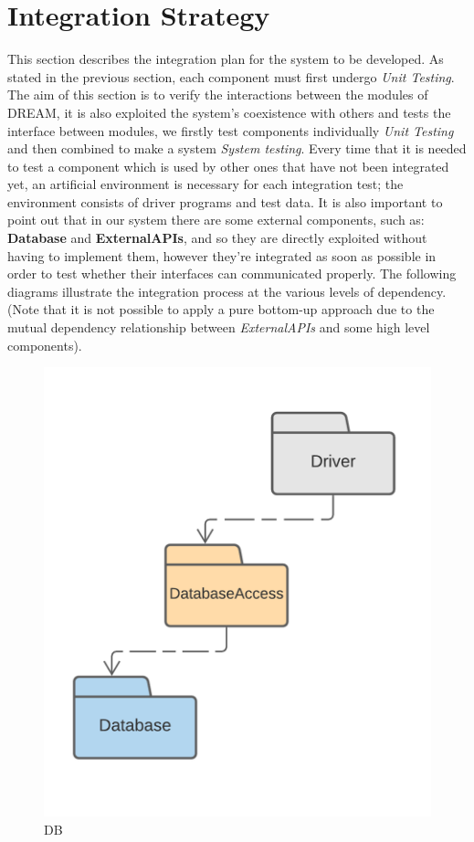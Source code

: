 \section{Integration Strategy}

This section describes the integration plan for the system to be developed. As stated in the previous section, each component must first undergo \textit{Unit Testing}.
The aim of this section is to verify the interactions between the modules of DREAM, it is also exploited the system's coexistence with others and tests the interface between modules, we firstly test components individually \textit{Unit Testing} and then combined to make a system \textit{System testing}.
Every time that it is needed to test a component which is used by other ones that have not been integrated yet, an artificial environment is necessary for each integration test; the environment consists of driver programs and test data.
It is also important to point out that in our system there are some external components, such as: \textbf{Database} and \textbf{ExternalAPIs}, and so they are directly exploited without having to implement them, however they're integrated as soon as possible in order to test whether their interfaces can communicated properly.
The following diagrams illustrate the integration process at the various levels of dependency.
(Note that it is not possible to apply a pure bottom-up approach due to the mutual dependency relationship between \textit{ExternalAPIs} and some high level components).
\begin{center}
    \begin{figure}[h!]
  \includegraphics[width=\textwidth,height=\textheight,keepaspectratio]{./Images/IntegrationStrategy/IT1.png}
  \caption{DB}
\end{figure}
\end{center}

